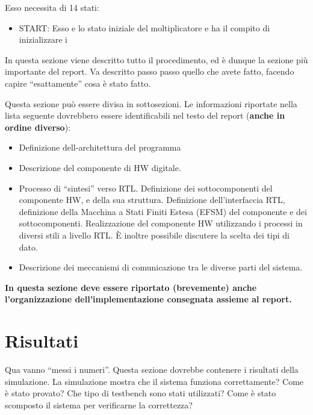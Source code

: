 \documentclass[]{IEEEtran}
\begin{document}
 Esso necessita di 14 stati:
\begin{itemize}
\item START: Esso e lo stato iniziale del moltiplicatore e ha il compito di inizializzare i 
\end{itemize}

In questa sezione viene descritto tutto il procedimento, ed \`e dunque la sezione pi\`u importante del report. Va descritto passo passo quello che avete fatto, facendo capire ``esattamente'' cosa \`e stato fatto.

Questa sezione pu\`o essere divisa in sottosezioni. Le informazioni riportate nella lista seguente dovrebbero essere identificabili nel testo del report (\textbf{anche in ordine diverso}):
\begin{itemize}
\item Definizione dell-architettura del programma
\item Descrizione del componente di HW digitale.
\item Processo di ``sintesi'' verso RTL. Definizione dei sottocomponenti del componente HW, e della sua struttura. Definizione dell'interfaccia RTL, definizione della Macchina a Stati Finiti Estesa (EFSM) del componente e dei sottocomponenti. Realizzazione del componente HW utilizzando i processi in diversi stili a livello RTL. \`E inoltre possibile discutere la scelta dei tipi di dato.
\item Descrizione dei meccanismi di comunicazione tra le diverse parti del sistema.
\end{itemize}

\textbf{In questa sezione deve essere riportato (brevemente) anche l'organizzazione dell'implementazione consegnata assieme al report.}

\section{Risultati}

Qua vanno ``messi i numeri''. Questa sezione dovrebbe contenere i risultati della simulazione. La simulazione mostra che il sistema funziona correttamente? Come \`e stato provato? Che tipo di testbench sono stati utilizzati? Come \`e stato scomposto il sistema per verificarne la correttezza?
\end{document}
